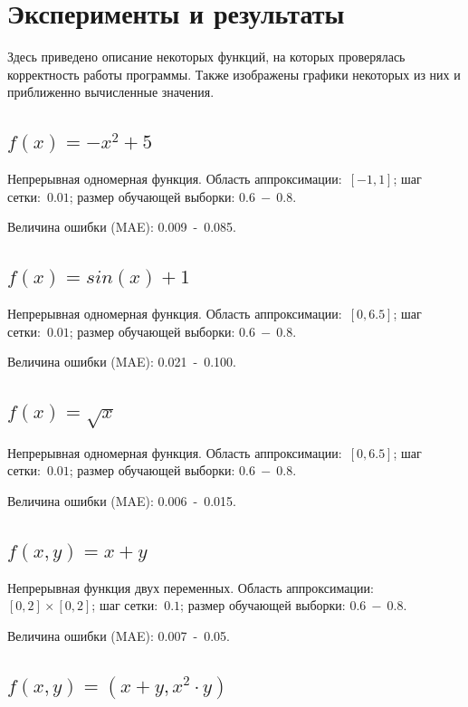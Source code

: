 \documentclass[12pt, a4paper]{article}
\begin{document}
    \section{Эксперименты и результаты}
    
    Здесь приведено описание некоторых функций, на которых проверялась 
    корректность работы программы. Также изображены графики некоторых из них и приближенно вычисленные значения.
    
    \subsection{$f(x) = - x^2 + 5$}
    
    Непрерывная одномерная функция. Область аппроксимации:~$[-1, 1]$; шаг 
    сетки:~$0.01$; размер обучающей выборки: $0.6~-~0.8$.
    
    Величина ошибки (MAE): 0.009~-~0.085.
    
    \subsection{$f(x) = sin(x) + 1$}
    
    Непрерывная одномерная функция. Область аппроксимации:~$[0, 6.5]$; шаг сетки:~$0.01$; размер обучающей выборки: $0.6~-~0.8$.
    
    Величина ошибки (MAE): 0.021~-~0.100.
    
    \subsection{$f(x) = \sqrt{x}$}
    
    Непрерывная одномерная функция. Область аппроксимации:~$[0, 6.5]$; шаг сетки:~$0.01$; размер обучающей выборки: $0.6~-~0.8$.
    
    Величина ошибки (MAE): 0.006~-~0.015.
    
    \subsection{$f(x, y) = x + y$}
    
    Непрерывная функция двух переменных. Область аппроксимации:~$[0, 2] \times [0, 2]$; шаг сетки:~$0.1$; размер обучающей выборки: $0.6~-~0.8$.
    
    Величина ошибки (MAE): 0.007~-~0.05.
    
    \subsection{$f(x, y) = (x + y, x^2 \cdot y)$}
    
\end{document}
